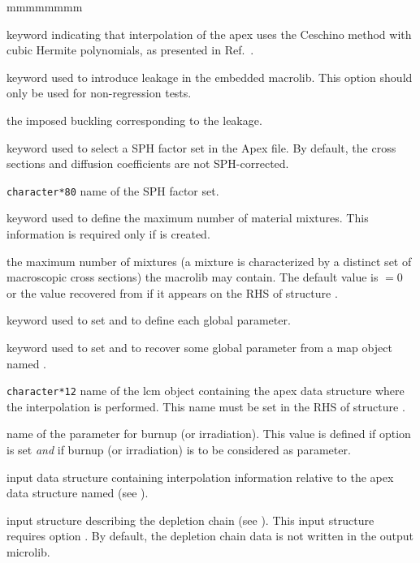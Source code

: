 \begin{ListeDeDescription}{mmmmmmmm}
\item[\moc{CUBIC}] keyword indicating that interpolation of the {\sc apex} uses the Ceschino method
with cubic Hermite polynomials, as presented in Ref.~.

\item[\moc{LEAK}] keyword used to introduce leakage in the embedded {\sc macrolib}. This option should only be used for non-regression tests.

\item[\dusa{b2}] the imposed buckling corresponding to the leakage.

\item[\moc{EQUI}] keyword used to select a SPH factor set in the Apex file. By default, the cross sections and diffusion coefficients
are not SPH-corrected.

\item[\dusa{text80}] {\tt character*80} name of the SPH factor set.

\item[\moc{NMIX}] keyword used to define the maximum number of material mixtures. This information is required only if  is created.

\item[\dusa{nmixt}] the maximum number of mixtures (a mixture is characterized by a distinct set of 
macroscopic cross sections) the {\sc macrolib} may contain. The default value is  $=0$ or the value recovered from  if it appears on the RHS
of structure .

\item[\moc{APEX}] keyword used to set  and to define each global parameter.

\item[\moc{TABLE}] keyword used to set  and to recover some global parameter from a {\sc map} object named .

\item[\dusa{APXNAM}] {\tt character*12} name of the {\sc lcm} object containing the
{\sc apex} data structure where the interpolation is performed. This name must be set in the RHS of structure .

\item[\dusa{namburn}] name of the parameter for burnup (or irradiation).
This value is defined if option  is set {\sl and} if burnup (or irradiation) is to be considered as parameter.

\item[\dusa{ACRdescints}] input data structure containing interpolation information relative to the {\sc apex} data structure named  (see ).

\item[\dstr{descdepl}] input structure describing the depletion chain (see ). This input structure requires option . By
default, the depletion chain data is not written in the output {\sc microlib}.

\end{ListeDeDescription}

